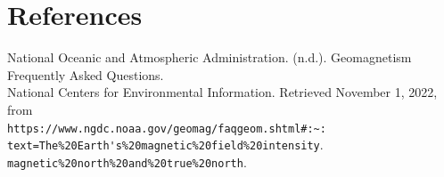 \documentclass[
	letterpaper, %
	10pt, %
]{CSUniSchoolLabReport}
\begin{document}
\section{References}
National Oceanic and Atmospheric Administration. (n.d.). Geomagnetism \\
\null\qquad Frequently Asked Questions.\\
\null\qquad National Centers for Environmental Information. Retrieved November 1, 2022,
\null\qquad from \\
\null\qquad\lstinline{https://www.ngdc.noaa.gov/geomag/faqgeom.shtml#:~:}\\
\null\qquad\lstinline{text=The%20Earth's%20magnetic%20field%20intensity}.\\
\null\qquad\lstinline{magnetic%20north%20and%20true%20north}.\\\\
\newpage
\end{document}
